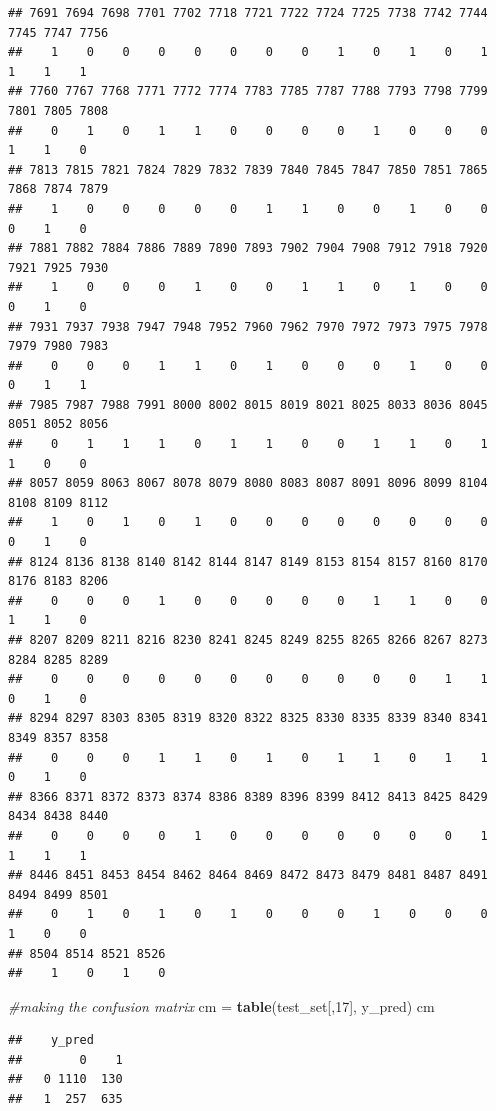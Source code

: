 \documentclass[
]{article}
\newenvironment{Shaded}{\begin{snugshade}}{\end{snugshade}}
\newcommand{\CommentTok}[1]{\textcolor[rgb]{0.56,0.35,0.01}{\textit{#1}}}
\newcommand{\DecValTok}[1]{\textcolor[rgb]{0.00,0.00,0.81}{#1}}
\newcommand{\KeywordTok}[1]{\textcolor[rgb]{0.13,0.29,0.53}{\textbf{#1}}}
\newcommand{\NormalTok}[1]{#1}
\newcommand{\StringTok}[1]{\textcolor[rgb]{0.31,0.60,0.02}{#1}}
\begin{document}
\begin{verbatim}
## 7691 7694 7698 7701 7702 7718 7721 7722 7724 7725 7738 7742 7744 7745 7747 7756 
##    1    0    0    0    0    0    0    0    1    0    1    0    1    1    1    1 
## 7760 7767 7768 7771 7772 7774 7783 7785 7787 7788 7793 7798 7799 7801 7805 7808 
##    0    1    0    1    1    0    0    0    0    1    0    0    0    1    1    0 
## 7813 7815 7821 7824 7829 7832 7839 7840 7845 7847 7850 7851 7865 7868 7874 7879 
##    1    0    0    0    0    0    1    1    0    0    1    0    0    0    1    0 
## 7881 7882 7884 7886 7889 7890 7893 7902 7904 7908 7912 7918 7920 7921 7925 7930 
##    1    0    0    0    1    0    0    1    1    0    1    0    0    0    1    0 
## 7931 7937 7938 7947 7948 7952 7960 7962 7970 7972 7973 7975 7978 7979 7980 7983 
##    0    0    0    1    1    0    1    0    0    0    1    0    0    0    1    1 
## 7985 7987 7988 7991 8000 8002 8015 8019 8021 8025 8033 8036 8045 8051 8052 8056 
##    0    1    1    1    0    1    1    0    0    1    1    0    1    1    0    0 
## 8057 8059 8063 8067 8078 8079 8080 8083 8087 8091 8096 8099 8104 8108 8109 8112 
##    1    0    1    0    1    0    0    0    0    0    0    0    0    0    1    0 
## 8124 8136 8138 8140 8142 8144 8147 8149 8153 8154 8157 8160 8170 8176 8183 8206 
##    0    0    0    1    0    0    0    0    0    1    1    0    0    1    1    0 
## 8207 8209 8211 8216 8230 8241 8245 8249 8255 8265 8266 8267 8273 8284 8285 8289 
##    0    0    0    0    0    0    0    0    0    0    0    1    1    0    1    0 
## 8294 8297 8303 8305 8319 8320 8322 8325 8330 8335 8339 8340 8341 8349 8357 8358 
##    0    0    0    1    1    0    1    0    1    1    0    1    1    0    1    0 
## 8366 8371 8372 8373 8374 8386 8389 8396 8399 8412 8413 8425 8429 8434 8438 8440 
##    0    0    0    0    1    0    0    0    0    0    0    0    1    1    1    1 
## 8446 8451 8453 8454 8462 8464 8469 8472 8473 8479 8481 8487 8491 8494 8499 8501 
##    0    1    0    1    0    1    0    0    0    1    0    0    0    1    0    0 
## 8504 8514 8521 8526 
##    1    0    1    0
\end{verbatim}

\begin{Shaded}
\begin{Highlighting}[]
\CommentTok{#making the confusion matrix}
\NormalTok{cm =}\StringTok{ }\KeywordTok{table}\NormalTok{(test_set[,}\DecValTok{17}\NormalTok{], y_pred)}
\NormalTok{cm}
\end{Highlighting}
\end{Shaded}

\begin{verbatim}
##    y_pred
##        0    1
##   0 1110  130
##   1  257  635
\end{verbatim}
\end{document}
